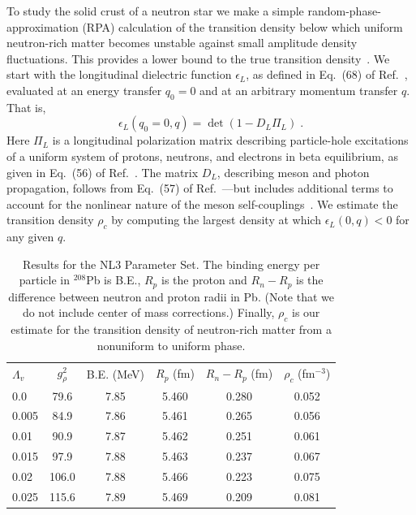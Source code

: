 To study the solid crust of a neutron star we make a simple 
random-phase-approximation (RPA) calculation of the transition 
density below which uniform neutron-rich matter becomes 
unstable against small amplitude density fluctuations. This 
provides a lower bound to the true transition 
density~\cite{bound}. We start with the longitudinal dielectric 
function $\epsilon_L$, as defined in Eq.~(68) of 
Ref.~\cite{wehrberger}, evaluated at an energy transfer 
$q_0\!=\!0$ and at an arbitrary momentum transfer $q$. That is,
\begin{equation}
\epsilon_L(q_0\!=\!0,q)=\det\left(1-D_L \Pi_L\right)\;.
\end{equation}
Here $\Pi_L$ is a longitudinal polarization matrix describing 
particle-hole excitations of a uniform system of protons, 
neutrons, and electrons in beta equilibrium, as given in 
Eq.~(56) of Ref.~\cite{wehrberger}. The matrix $D_L$, describing 
meson and photon propagation, follows from Eq.~(57) of 
Ref.~\cite{wehrberger}---but includes additional terms to account 
for the nonlinear nature of the meson self-couplings~\cite{future}. 
We estimate the transition density $\rho_{c}$ by computing  
the largest density at which $\epsilon_L(0,q)\!<\!0$ for any 
given $q$.

\begin{table}[h]
\caption{Results for the NL3 Parameter Set. The binding 
energy per particle in $^{208}$Pb is B.E., $R_p$ is the 
proton and $R_n-R_p$ is the difference between neutron 
and proton radii in Pb. (Note that we do not include 
center of mass corrections.)  Finally, $\rho_c$ is our 
estimate for the transition density of neutron-rich 
matter from a nonuniform to uniform phase.}
\begin{tabular}{lccccc}
$\Lambda_v$& $g_\rho^2$ & B.E. (MeV) & $R_p$ (fm) 
& $R_n-R_p$ (fm) & $\rho_c$ (fm$^{-3}$) \\
0.0 	& 79.6 	&  7.85 & 5.460 & 0.280 & 0.052 \\
0.005   & 84.9  &  7.86 & 5.461 & 0.265 & 0.056 \\
0.01    & 90.9  &  7.87 & 5.462 & 0.251 & 0.061 \\
0.015   & 97.9  &  7.88 & 5.463 & 0.237 & 0.067 \\
0.02    & 106.0 &  7.88 & 5.466 & 0.223 & 0.075 \\
0.025   & 115.6 &  7.89 & 5.469 & 0.209 & 0.081 
\label{tableone}
\end{tabular}
\end{table}

